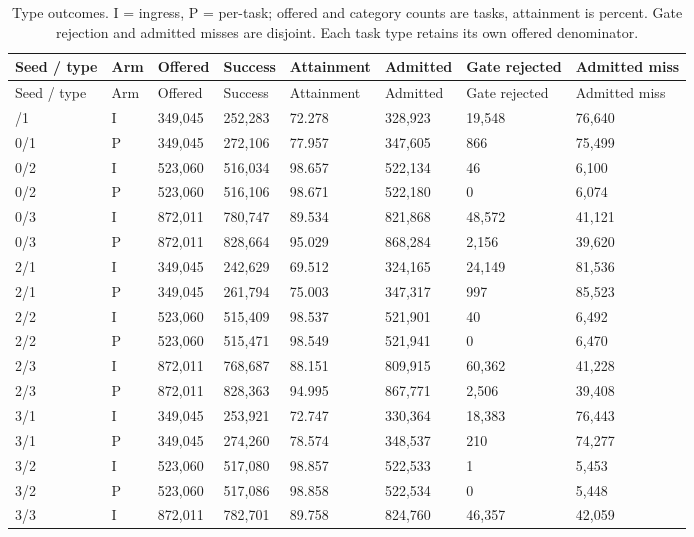 \documentclass[12pt,a4paper]{article}
\begin{document}
\begingroup
\singlespacing\footnotesize\setlength{\tabcolsep}{3pt}
\begin{xltabular}{\textwidth}{@{}YYYYYYYY@{}}
\caption[Type outcomes]{Type outcomes. I = ingress, P = per-task; offered and category counts are tasks, attainment is percent. Gate rejection and admitted misses are disjoint. Each task type retains its own offered denominator.}\label{tab:D1} \\
\toprule
Seed / type & Arm & Offered & Success & Attainment & Admitted & Gate rejected & Admitted miss \\
\midrule\endfirsthead
\toprule
Seed / type & Arm & Offered & Success & Attainment & Admitted & Gate rejected & Admitted miss \\
\midrule\endhead
\bottomrule{}/1 & I & 349,045 & 252,283 & 72.278 & 328,923 & 19,548 & 76,640 \\
0/1 & P & 349,045 & 272,106 & 77.957 & 347,605 & 866 & 75,499 \\
0/2 & I & 523,060 & 516,034 & 98.657 & 522,134 & 46 & 6,100 \\
0/2 & P & 523,060 & 516,106 & 98.671 & 522,180 & 0 & 6,074 \\
0/3 & I & 872,011 & 780,747 & 89.534 & 821,868 & 48,572 & 41,121 \\
0/3 & P & 872,011 & 828,664 & 95.029 & 868,284 & 2,156 & 39,620 \\
2/1 & I & 349,045 & 242,629 & 69.512 & 324,165 & 24,149 & 81,536 \\
2/1 & P & 349,045 & 261,794 & 75.003 & 347,317 & 997 & 85,523 \\
2/2 & I & 523,060 & 515,409 & 98.537 & 521,901 & 40 & 6,492 \\
2/2 & P & 523,060 & 515,471 & 98.549 & 521,941 & 0 & 6,470 \\
2/3 & I & 872,011 & 768,687 & 88.151 & 809,915 & 60,362 & 41,228 \\
2/3 & P & 872,011 & 828,363 & 94.995 & 867,771 & 2,506 & 39,408 \\
3/1 & I & 349,045 & 253,921 & 72.747 & 330,364 & 18,383 & 76,443 \\
3/1 & P & 349,045 & 274,260 & 78.574 & 348,537 & 210 & 74,277 \\
3/2 & I & 523,060 & 517,080 & 98.857 & 522,533 & 1 & 5,453 \\
3/2 & P & 523,060 & 517,086 & 98.858 & 522,534 & 0 & 5,448 \\
3/3 & I & 872,011 & 782,701 & 89.758 & 824,760 & 46,357 & 42,059 \\

\end{xltabular}
\end{document}

